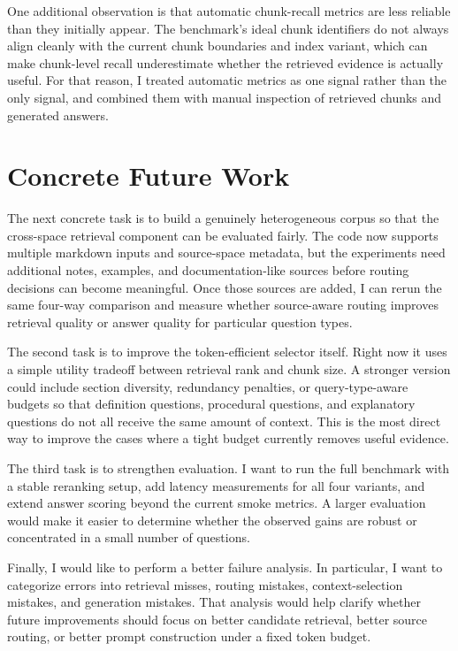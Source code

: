 \documentclass[10pt,twocolumn]{article}
\begin{document}
One additional observation is that automatic chunk-recall metrics are less reliable than they initially appear. The benchmark's ideal chunk identifiers do not always align cleanly with the current chunk boundaries and index variant, which can make chunk-level recall underestimate whether the retrieved evidence is actually useful. For that reason, I treated automatic metrics as one signal rather than the only signal, and combined them with manual inspection of retrieved chunks and generated answers.

\section*{Concrete Future Work}
The next concrete task is to build a genuinely heterogeneous corpus so that the cross-space retrieval component can be evaluated fairly. The code now supports multiple markdown inputs and source-space metadata, but the experiments need additional notes, examples, and documentation-like sources before routing decisions can become meaningful. Once those sources are added, I can rerun the same four-way comparison and measure whether source-aware routing improves retrieval quality or answer quality for particular question types.

The second task is to improve the token-efficient selector itself. Right now it uses a simple utility tradeoff between retrieval rank and chunk size. A stronger version could include section diversity, redundancy penalties, or query-type-aware budgets so that definition questions, procedural questions, and explanatory questions do not all receive the same amount of context. This is the most direct way to improve the cases where a tight budget currently removes useful evidence.

The third task is to strengthen evaluation. I want to run the full benchmark with a stable reranking setup, add latency measurements for all four variants, and extend answer scoring beyond the current smoke metrics. A larger evaluation would make it easier to determine whether the observed gains are robust or concentrated in a small number of questions.

Finally, I would like to perform a better failure analysis. In particular, I want to categorize errors into retrieval misses, routing mistakes, context-selection mistakes, and generation mistakes. That analysis would help clarify whether future improvements should focus on better candidate retrieval, better source routing, or better prompt construction under a fixed token budget.
\end{document}
